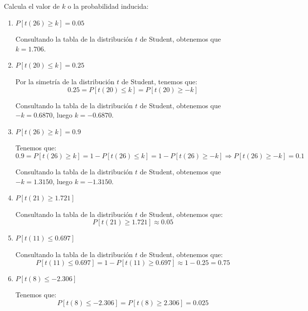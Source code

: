 \begin{ejemplo}
    Calcula el valor de $k$ o la probabilidad inducida:
    \begin{enumerate}[label=\alph*)]
        \item $P[t(26)\geq k] = 0.05$

            Consultando la tabla de la distribución $t$ de Student, obtenemos que $k = 1.706$.
        \item $P[t(20)\leq k] = 0.25$
        
            Por la simetría de la distribución $t$ de Student, tenemos que:
            \begin{equation*}
                0.25 = P[t(20)\leq k] = P[t(20)\geq -k]
            \end{equation*}

            Consultando la tabla de la distribución $t$ de Student, obtenemos que $-k = 0.6870$, luego $k = -0.6870$.
        \item $P[t(26) \geq k] = 0.9$

            Tenemos que:
            \begin{equation*}
                0.9 = P[t(26) \geq k] = 1-P[t(26) \leq k] = 1-P[t(26) \geq -k] \Longrightarrow P[t(26) \geq -k] = 0.1
            \end{equation*}

            Consultando la tabla de la distribución $t$ de Student, obtenemos que $-k = 1.3150$, luego $k = -1.3150$.
        \item $P[t(21) \geq 1.721]$

            Consultando la tabla de la distribución $t$ de Student, obtenemos que:
            \begin{equation*}
                P[t(21) \geq 1.721] \approx 0.05
            \end{equation*}
        \item $P[t(11) \leq 0.697]$
        
            Consultando la tabla de la distribución $t$ de Student, obtenemos que:
            \begin{equation*}
                P[t(11) \leq 0.697] = 1-P[t(11) \geq 0.697] \approx 1-0.25 = 0.75
            \end{equation*}
        \item $P[t(8) \leq -2.306]$
        
            Tenemos que:
            \begin{equation*}
                P[t(8) \leq -2.306] = P[t(8) \geq 2.306] = 0.025
            \end{equation*}
    \end{enumerate}
\end{ejemplo}

